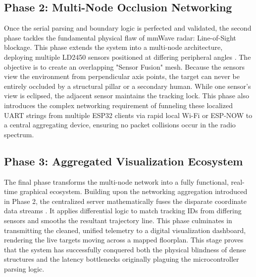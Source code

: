 \subsection{Phase 2: Multi-Node Occlusion Networking}
Once the serial parsing and boundary logic is perfected and validated, the second phase tackles the fundamental physical flaw of mmWave radar: Line-of-Sight blockage. This phase extends the system into a multi-node architecture, deploying multiple LD2450 sensors positioned at differing peripheral angles \cite{akyildiz2005wireless}. The objective is to create an overlapping "Sensor Fusion" mesh. Because the sensors view the environment from perpendicular axis points, the target can never be entirely occluded by a structural pillar or a secondary human. While one sensor's view is eclipsed, the adjacent sensor maintains the tracking lock. This phase also introduces the complex networking requirement of funneling these localized UART strings from multiple ESP32 clients via rapid local Wi-Fi or ESP-NOW to a central aggregating device, ensuring no packet collisions occur in the radio spectrum.

\subsection{Phase 3: Aggregated Visualization Ecosystem}
The final phase transforms the multi-node network into a fully functional, real-time graphical ecosystem. Building upon the networking aggregation introduced in Phase 2, the centralized server mathematically fuses the disparate coordinate data streams \cite{niculescu2001ad}. It applies differential logic to match tracking IDs from differing sensors and smooths the resultant trajectory line. This phase culminates in transmitting the cleaned, unified telemetry to a digital visualization dashboard, rendering the live targets moving across a mapped floorplan. This stage proves that the system has successfully conquered both the physical blindness of dense structures and the latency bottlenecks originally plaguing the microcontroller parsing logic.

